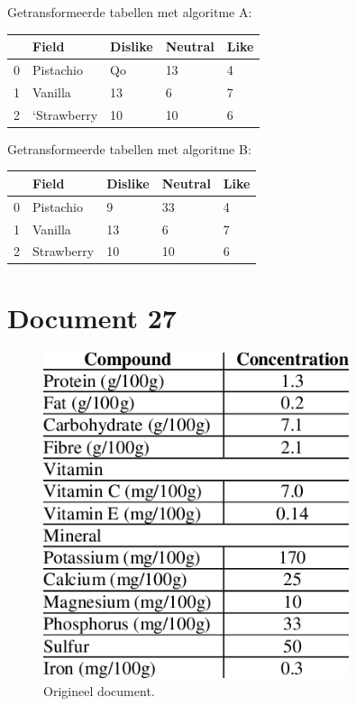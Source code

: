Getransformeerde tabellen met algoritme A:

\begin{tabular}{lllll}
\toprule
{} &        Field & Dislike & Neutral & Like \\
\midrule
0 &    Pistachio &      Qo &      13 &    4 \\
1 &      Vanilla &      13 &       6 &    7 \\
2 &  ‘Strawberry &      10 &      10 &    6 \\
\bottomrule
\end{tabular}

Getransformeerde tabellen met algoritme B:

\begin{tabular}{lllll}
\toprule
{} &       Field & Dislike & Neutral & Like \\
\midrule
0 &   Pistachio &       9 &      33 &    4 \\
1 &     Vanilla &      13 &       6 &    7 \\
2 &  Strawberry &      10 &      10 &    6 \\
\bottomrule
\end{tabular}
\section{Document 27}

\begin{figure}[H]
    \centering
    \includegraphics[width=0.8\textwidth]{test-resultaten/27/original.png}
    \caption{Origineel document.}
\end{figure}

